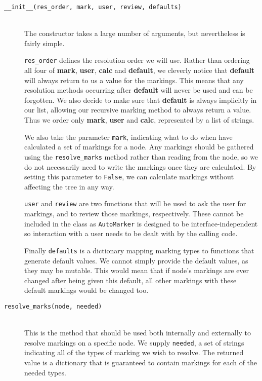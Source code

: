 \documentclass[twoside,a4paper]{report}
\begin{document}
\begin{description}
\item[\texttt{\_\_init\_\_(res\_order, mark, user, review, defaults)}] \hfill \\
The constructor takes a large number of arguments, but nevertheless is fairly simple.

\texttt{res\_order} defines the resolution order we will use. Rather than ordering all four of \textbf{mark}, \textbf{user}, \textbf{calc} and
\textbf{default}, we cleverly notice that \textbf{default} will always return to us a value for the markings. This means that any resolution methods
occurring after \textbf{default} will never be used and can be forgotten. We also decide to make sure that \textbf{default} is always implicitly in
our list, allowing our recursive marking method to always return a value. Thus we order only \textbf{mark}, \textbf{user} and \textbf{calc},
represented by a list of strings.

We also take the parameter \texttt{mark}, indicating what to do when have calculated a set of markings for a node. Any markings should be gathered using
the \texttt{resolve\_marks} method rather than reading from the node, so we do not necessarily need to write the markings once they are calculated. By
setting this parameter to \texttt{False}, we can calculate markings without affecting the tree in any way.

\texttt{user} and \texttt{review} are two functions that will be used to ask the user for markings, and to review those markings, respectively. These
cannot be included in the class as \texttt{AutoMarker} is designed to be interface-independent so interaction with a user needs to be dealt with by
the calling code.

Finally \texttt{defaults} is a dictionary mapping marking types to functions that generate default values. We cannot simply provide the default values,
as they may be mutable. This would mean that if node's markings are ever changed after being given this default, all other markings with these default
markings would be changed too.

\item[\texttt{resolve\_marks(node, needed)}] \hfill \\
This is the method that should be used both internally and externally to resolve markings on a specific node. We supply \texttt{needed}, a set of strings
indicating all of the types of marking we wish to resolve. The returned value is a dictionary that is guaranteed to contain markings for each of the
needed types.


\end{description}
\end{document}
